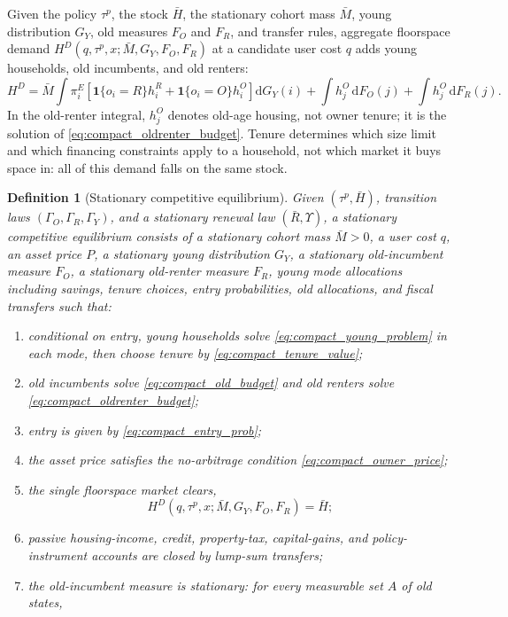 \documentclass[11pt]{article}
\newtheorem{definition}{Definition}
\newcommand{\dd}{\mathrm d}
\newcommand{\1}{\mathbf 1}
\begin{document}
Given the policy $\tau^p$, the stock $\bar H$, the stationary cohort mass $\bar M$, young distribution $G_Y$, old measures $F_O$ and $F_R$, and transfer rules, aggregate floorspace demand $H^{D}(q,\tau^p,x;\bar M,G_Y,F_O,F_R)$ at a candidate user cost $q$ adds young households, old incumbents, and old renters:
\[
H^{D}
=
\bar M\int \pi_i^E
\left[
\1\{o_i=R\}h_i^R+\1\{o_i=O\}h_i^O
\right]\dd G_Y(i)
+
\int h_j^O\,\dd F_O(j)
+
\int h_j^O\,\dd F_R(j).
\]
In the old-renter integral, $h_j^O$ denotes old-age housing, not owner tenure; it is the solution of \eqref{eq:compact_oldrenter_budget}. Tenure determines which size limit and which financing constraints apply to a household, not which market it buys space in: all of this demand falls on the same stock.

\begin{definition}[Stationary competitive equilibrium]
Given $(\tau^p,\bar H)$, transition laws $(\Gamma_O,\Gamma_R,\Gamma_Y)$, and a stationary renewal law $(\bar R,\Upsilon)$, a stationary competitive equilibrium consists of a stationary cohort mass $\bar M>0$, a user cost $q$, an asset price $P$, a stationary young distribution $G_Y$, a stationary old-incumbent measure $F_O$, a stationary old-renter measure $F_R$, young mode allocations including savings, tenure choices, entry probabilities, old allocations, and fiscal transfers such that:
\begin{enumerate}
\item conditional on entry, young households solve \eqref{eq:compact_young_problem} in each mode, then choose tenure by \eqref{eq:compact_tenure_value};
\item old incumbents solve \eqref{eq:compact_old_budget} and old renters solve \eqref{eq:compact_oldrenter_budget};
\item entry is given by \eqref{eq:compact_entry_prob};
\item the asset price satisfies the no-arbitrage condition \eqref{eq:compact_owner_price};
\item the single floorspace market clears,
\begin{equation}
H^{D}(q,\tau^p,x;\bar M,G_Y,F_O,F_R)=\bar H;
\label{eq:compact_floorspace_clearing}
\end{equation}
\item passive housing-income, credit, property-tax, capital-gains, and policy-instrument accounts are closed by lump-sum transfers;
\item the old-incumbent measure is stationary: for every measurable set $A$ of old states,

\end{enumerate}
\end{definition}
\end{document}
